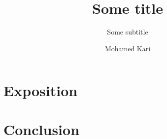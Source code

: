 \documentclass[
    headings=standardclasses,
    DIV=15
]{scrartcl}
\title{Some title}
\subtitle{Some subtitle}
\author{Mohamed Kari}
\date{} %
\begin{document}
\maketitle


\tableofcontents


\section{Exposition}
\section{Conclusion}





% 


% 

\cite{Rowling2000}

\clearpage
\printbibliography

\end{document}
